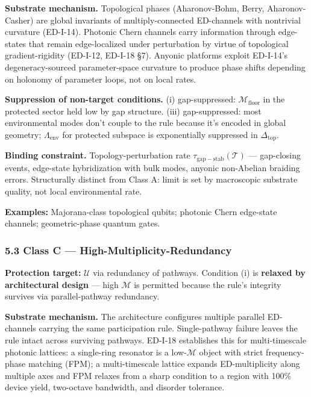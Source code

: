 \documentclass[
  11pt,
  a4paper,
]{article}
\begin{document}
\textbf{Substrate mechanism.} Topological phases (Aharonov-Bohm, Berry,
Aharonov-Casher) are global invariants of multiply-connected ED-channels
with nontrivial curvature (ED-I-14). Photonic Chern channels carry
information through edge-states that remain edge-localized under
perturbation by virtue of topological gradient-rigidity (ED-I-12,
ED-I-18 §7). Anyonic platforms exploit ED-I-14's degeneracy-sourced
parameter-space curvature to produce phase shifts depending on holonomy
of parameter loops, not on local rates.

\textbf{Suppression of non-target conditions.} (i) gap-suppressed:
\(\mathcal{M}_{\mathrm{floor}}\) in the protected sector held low by gap
structure. (iii) gap-suppressed: most environmental modes don't couple
to the rule because it's encoded in global geometry;
\(\Lambda_{\mathrm{env}}\) for protected subspace is exponentially
suppressed in \(\Delta_{\mathrm{top}}\).

\textbf{Binding constraint.} Topology-perturbation rate
\(\tau_{\mathrm{gap-stab}}(\mathcal{T})\) --- gap-closing events,
edge-state hybridization with bulk modes, anyonic non-Abelian braiding
errors. Structurally distinct from Class A: limit is set by macroscopic
substrate quality, not local environmental rate.

\textbf{Examples:} Majorana-class topological qubits; photonic Chern
edge-state channels; geometric-phase quantum gates.

\subsubsection{5.3 Class C ---
High-Multiplicity-Redundancy}\label{class-c-high-multiplicity-redundancy}

\textbf{Protection target:} \(\mathcal{U}\) via redundancy of pathways.
Condition (i) is \textbf{relaxed by architectural design} --- high
\(\mathcal{M}\) is permitted because the rule's integrity survives via
parallel-pathway redundancy.

\textbf{Substrate mechanism.} The architecture configures multiple
parallel ED-channels carrying the same participation rule.
Single-pathway failure leaves the rule intact across surviving pathways.
ED-I-18 establishes this for multi-timescale photonic lattices: a
single-ring resonator is a low-\(\mathcal{M}\) object with strict
frequency-phase matching (FPM); a multi-timescale lattice expands
ED-multiplicity along multiple axes and FPM relaxes from a sharp
condition to a region with 100\% device yield, two-octave bandwidth, and
disorder tolerance.
\end{document}
